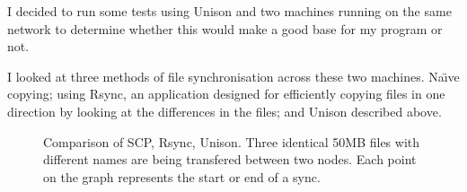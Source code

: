 \documentclass[12pt]{article}
\begin{document}
I decided to run some tests using Unison 
and two machines running on the same network to 
determine whether this would make a good base for
my program or not.

I looked at three methods of file synchronisation across
these two machines. Na\"{\i}ve copying; using Rsync, an application
designed for efficiently copying files in one direction by looking at
the differences in the files; and Unison described above.

\begin{figure}[htp]
    \caption{Comparison of SCP, Rsync, Unison. Three identical 50MB files 
    with different names are being transfered between two nodes. Each
    point on the graph represents the start or end of a sync.}
    \label{fig:point_comp_graph}
\end{figure}
\end{document}
